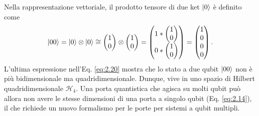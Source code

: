 Nella rappresentazione vettoriale, il prodotto tensore di due ket $\ket{0}$ è definito come 
\begin{equation} \label{eq:2.20}
    \ket{00} = \ket{0} \otimes \ket{0} \cong 
    \begin{pmatrix}
        1\\0
    \end{pmatrix} \otimes 
    \begin{pmatrix}
        1\\0
    \end{pmatrix} = 
    \begin{pmatrix}
        1*\begin{pmatrix}
            1\\0
        \end{pmatrix} \\ 0 * 
        \begin{pmatrix}
            1\\0
        \end{pmatrix}
    \end{pmatrix} = 
    \begin{pmatrix}
        1\\0\\0\\0
    \end{pmatrix}.
\end{equation}
L'ultima espressione nell'Eq. \ref{eq:2.20} mostra che lo stato a due qubit $\ket{00}$ non è 
più bidimensionale ma quadridimensionale. Dunque, vive in uno spazio di Hilbert quadridimensionale 
$\mathcal{H}_4$. Una porta quantistica che agisca su molti qubit può allora non avere le stesse 
dimensioni di una porta a singolo qubit (Eq. \ref{eq:2.14}), il che richiede un nuovo formalismo 
per le porte per sistemi a qubit multipli. 

